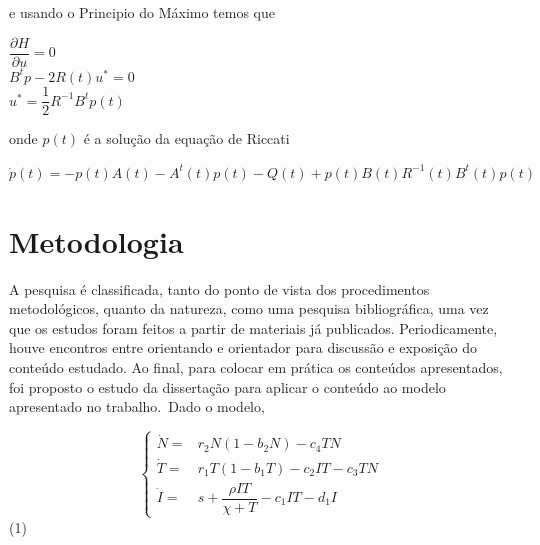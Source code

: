 \documentclass[12pt, a4paper]{article}
\begin{document}
e usando o Principio do Máximo temos que

\begin{center}
$ \dfrac{\partial H}{\partial u} = 0 $\\
$ B^tp - 2R(t)u^* = 0 $\\
$u^* = \dfrac{1}{2}R^{-1}B^tp(t)$\\
\end{center}

onde $p(t)$ é a solução da equação de Riccati 

\begin{center}
$ \dot{p}(t) = -p(t)A(t) - A^t(t)p(t) - Q(t) + p(t)B(t)R^{-1}(t)B^t(t)p(t)$
\end{center}
\newpage

\section{Metodologia}

A pesquisa é classificada, tanto do ponto de vista dos procedimentos metodológicos, quanto da natureza, como uma pesquisa bibliográfica, uma vez que os estudos foram feitos a partir de materiais já publicados. Periodicamente, houve encontros entre orientando e orientador para discussão e exposição do conteúdo estudado. Ao final, para colocar em prática os conteúdos apresentados, foi proposto o estudo da dissertação \cite{Tanisia2008} para aplicar o conteúdo ao modelo apresentado no trabalho.\
Dado o modelo,
\begin{center}

$$
\left \{
\begin{array}{rl}
\dot N = & r_2 N (1-b_2N)-c_4 TN \\
\dot T = & r_1 T (1-b_1T)-c_2 IT - c_3 TN \\
\dot I = & s+\dfrac{\rho I T}{\chi + T} - c_1 I T - d_1 I
\end{array}
\right .
$$ (1)
\end{center}
\end{document}
